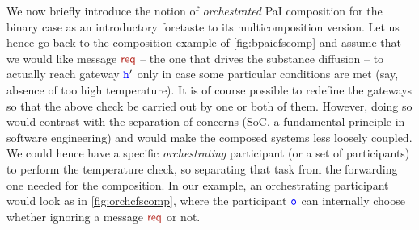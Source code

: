 We now briefly introduce the notion of {\em orchestrated} PaI composition for the binary case as 
an introductory foretaste to its multicomposition version.
Let us hence go back to the composition example of \cref{fig:bpaicfscomp} and assume that
we would like message $\msg[req]$ -- the one that drives the substance diffusion -- 
to actually reach gateway ${\mathtt{\color{blue}{ {h}}}}'$ only in case some particular conditions are met (say, absence of too high temperature).
It is of course possible to redefine the gateways so that the above check be carried out by one or both of them. However, doing so would contrast with the
separation of concerns (SoC, a fundamental principle in software engineering) and would make the
composed systems less loosely coupled.
We could hence have a specific {\em orchestrating} participant (or a set of participants) to perform the temperature check, so separating that task from the forwarding one needed for the composition. 
In our example, an orchestrating participant would look as in \cref{fig:orchcfscomp},
where the participant ${\mathtt{\color{blue}{ {o}}}}$ can internally choose whether ignoring a message $\msg[req]$ or not.
